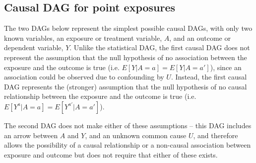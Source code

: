 \documentclass[a4paper]{report}
\begin{document}
\subsection{Causal DAG for point exposures}
The two DAGs below represent the simplest possible causal DAGs, with only two known variables, an exposure or treatment variable, $A$, and an outcome or dependent variable, $Y$. Unlike the statistical DAG, the first causal DAG does not represent the assumption that the null hypothesis of no association between the exposure and the outcome is true (i.e. $E[Y|A=a]=E[Y|A=a']$), since an association could be observed due to confounding by $U$. Instead, the first causal DAG represents the (stronger) assumption that the null hypothesis of no causal relationship between the exposure and the outcome is true (i.e. $E[Y^{a}|A=a]=E[Y^{a'}|A=a']$).

The second DAG does not make either of these assumptions -- this DAG includes an arrow between $A$ and $Y$, and an unknown common cause $U$, and therefore allows the possibility of a causal relationship or a non-causal association between exposure and outcome but does not require that either of these exists.

\vspace{3mm}
\end{document}
